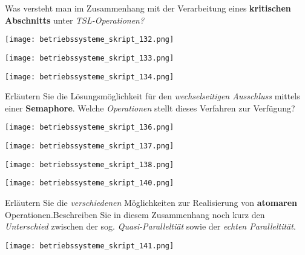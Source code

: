 \documentclass{article}
\begin{document}
\begin{tcolorbox}[colback=white!10!white,colframe=lightgray!75!black,
  savelowerto=\jobname_ex.tex,breakable,enhanced,lines before break=40]

\justifying
Was versteht man im Zusammenhang mit der Verarbeitung eines \textbf{kritischen Abschnitts} unter \textit{TSL-Operationen?}

\tcblower

\justifying
\begin{center}
\texttt{[image: betriebssysteme\_skript\_132.png]}
\end{center}
\begin{center}
\texttt{[image: betriebssysteme\_skript\_133.png]}
\end{center}
\begin{center}
\texttt{[image: betriebssysteme\_skript\_134.png]}
\end{center}

\end{tcolorbox}
\begin{tcolorbox}[colback=white!10!white,colframe=lightgray!75!black,
  savelowerto=\jobname_ex.tex,breakable,enhanced,lines before break=40]

\justifying
Erläutern Sie die Lösungsmöglichkeit für den \textit{wechselseitigen Ausschluss} mittels einer \textbf{Semaphore}. Welche \textit{Operationen} stellt dieses Verfahren zur Verfügung?

\tcblower

\justifying
\begin{center}
\texttt{[image: betriebssysteme\_skript\_136.png]}
\end{center}
\begin{center}
\texttt{[image: betriebssysteme\_skript\_137.png]}
\end{center}
\begin{center}
\texttt{[image: betriebssysteme\_skript\_138.png]}
\end{center}
\begin{center}
\texttt{[image: betriebssysteme\_skript\_140.png]}
\end{center}

\end{tcolorbox}
\begin{tcolorbox}[colback=white!10!white,colframe=lightgray!75!black,
  savelowerto=\jobname_ex.tex,breakable,enhanced,lines before break=40]

\justifying
Erläutern Sie die \textit{verschiedenen} Möglichkeiten zur Realisierung von \textbf{atomaren} Operationen.Beschreiben Sie in diesem Zusammenhang noch kurz den \textit{Unterschied} zwischen der sog. \textit{Quasi-Paralleltiät} sowie der \textit{echten Paralleltität}.

\tcblower

\justifying
\begin{center}
\texttt{[image: betriebssysteme\_skript\_141.png]}
\end{center}

\end{tcolorbox}
\end{document}
